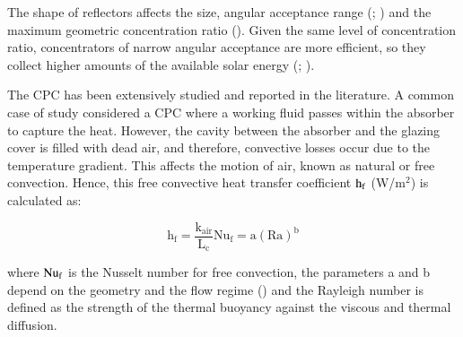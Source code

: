 

The shape of reflectors affects the size, angular acceptance range (\cite{Zacharopoulos2000}; \cite{Harmim2012}) and the maximum geometric concentration ratio (\cite{Mills1978}). Given the same level of concentration ratio, concentrators of narrow angular acceptance are more efficient, so they collect higher amounts of the available solar energy (\cite{Sarmah2011}; \cite{Kostic2012}).

The CPC has been extensively studied and reported in the literature. A common case of study considered a CPC where a working fluid passes within the absorber to capture the heat. However, the cavity between the absorber and the glazing cover is filled with dead air, and therefore, convective losses occur due to the temperature gradient. This affects the motion of air, known as natural or free convection. Hence, this free convective heat transfer coefficient $\rm{h_f}$ (W/m$^2$) is calculated as:

\begin{equation}
	\mathrm{h_f = \frac{{{k_{air}}}}{{{L_c}}}Nu_{f} = a{(Ra)^b}}
	\label{hn}
\end{equation}

\noindent where $\rm{Nu_f}$ is the Nusselt number for free convection, the parameters a and b depend on the geometry and the flow regime (\cite{Cengel2005}) and the Rayleigh number is defined as the strength of the thermal buoyancy against the viscous and thermal diffusion.

%
%

